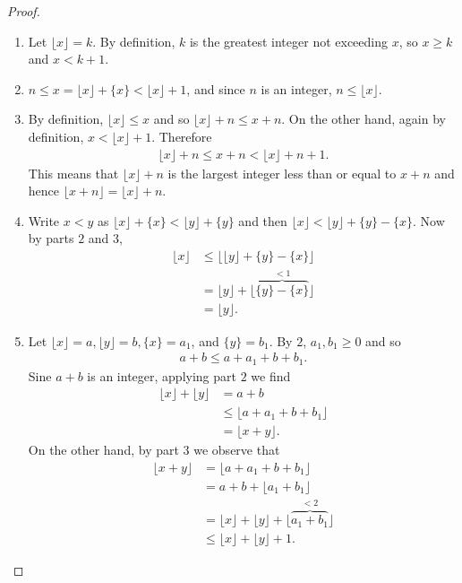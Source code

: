 \documentclass[12pt]{subfile}
\begin{document}
        \begin{proof}
        	\begin{enumerate}[1.]
        		\item Let $\lfloor x \rfloor=k$. By definition, $k$ is the greatest integer not exceeding $x$, so $x \geq k$ and $x<k+1$.
        		\item $n \leq x = \lfloor x \rfloor + \{x\} <\lfloor x \rfloor +1$, and since $n$ is an integer, $n \leq \lfloor x \rfloor$.
        		\item By definition, $\lfloor x \rfloor \leq x$ and so $\lfloor x \rfloor+n \leq x+n$. On the other hand, again by definition, $x < \lfloor x \rfloor+1$. Therefore
        		\begin{align*}
        		\lfloor x \rfloor +n \leq x+n < \lfloor x \rfloor + n+ 1.
        		\end{align*}
        		This means that $\lfloor x \rfloor +n$ is the largest integer less than or equal to $x+n$ and hence $\lfloor x+n\rfloor=\lfloor x\rfloor+n$.
        		\item Write $x<y$ as $\lfloor x \rfloor + \{x\} < \lfloor y \rfloor + \{y\}$ and then $\lfloor x \rfloor < \lfloor y \rfloor +\{y\}-\{x\}$. Now by parts $2$ and $3$,
        		\begin{align*}
        		\lfloor x \rfloor &\leq \bigg\lfloor\lfloor y \rfloor +\{y\}-\{x\}\bigg\rfloor\\
        		&= \lfloor y \rfloor + \bigg\lfloor\overbrace{\{y\}-\{x\}}^{<1}\bigg\rfloor\\
        		&= \lfloor y \rfloor.
        		\end{align*}
        		\item Let $	\lfloor x \rfloor=a, \lfloor y \rfloor=b, \{x\}=a_1$, and $\{y\}=b_1$. By $2$, $a_1, b_1 \geq 0$ and so
        		\begin{align*}
        		a+b \leq a+a_1+b+b_1.
        		\end{align*}
        		Sine $a+b$ is an integer, applying part $2$ we find
        		\begin{align*}
        		\lfloor x \rfloor + \lfloor y \rfloor &= a+b \\
        		&\leq \lfloor a+a_1+b+b_1 \rfloor\\
        		&= \lfloor x+y \rfloor.
        		\end{align*}
        		On the other hand, by part $3$ we observe that
        		\begin{align*}
        		\lfloor x+y \rfloor &= \lfloor a+a_1+b+b_1 \rfloor\\
        		&= a + b + \lfloor a_1+b_1 \rfloor\\
        		&= \lfloor x \rfloor + \lfloor y \rfloor + \lfloor \overbrace{a_1+b_1}^{<2} \rfloor\\
        		&\leq \lfloor x \rfloor + \lfloor y \rfloor + 1.
        		\end{align*}


\end{enumerate}
\end{proof}
\end{document}
